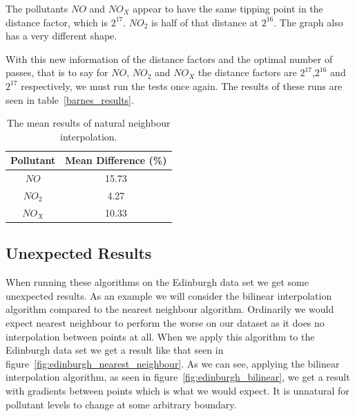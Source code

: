         	The pollutants $NO$ and $NO_{X}$ appear to have the same tipping point in the distance factor, which is $2^{17}$. $NO_{2}$ is half of that distance at $2^{16}$. The graph also has a very different shape. 

        	With this new information of the distance factors and the optimal number of passes, that is to say for $NO$, $NO_{2}$ and $NO_{X}$ the distance factors are $2^{17}$,$2^{16}$ and $2^{17}$ respectively, we must run the tests once again. The results of these runs are seen in table~\ref{barnes_results}.

        	\begin{table}[H]
				\centering
	    		\begin{tabular}{|c|c|}
	    			\hline
					Pollutant & Mean Difference (\%) \\ \hline
					$NO$ & 15.73 \\
					$NO_{2}$ & 4.27 \\
					$NO_{X}$ & 10.33 \\
					\hline
				\end{tabular}
				\caption{The mean results of natural neighbour interpolation.}
				\label{tab:barnes_results}
			\end{table} 

		\subsection{Unexpected Results}

			When running these algorithms on the Edinburgh data set we get some unexpected results. As an example we will consider the bilinear interpolation algorithm compared to the nearest neighbour algorithm. Ordinarily we would expect nearest neighbour to perform the worse on our dataset as it does no interpolation between points at all. When we apply this algorithm to the Edinburgh data set we get a result like that seen in figure~\ref{fig:edinburgh_nearest_neighbour}. As we can see, applying the bilinear interpolation algorithm, as seen in figure~\ref{fig:edinburgh_bilinear}, we get a result with gradients between points which is what we would expect. It is unnatural for pollutant levels to change at some arbitrary boundary. 

